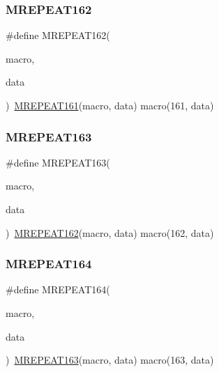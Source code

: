 \mbox{\label{group__group__sam0__utils__mrepeat_ga24cbd158a09a6694b3578c3332dbe324}} 
\subsubsection{\texorpdfstring{MREPEAT162}{MREPEAT162}}
{\footnotesize\ttfamily \#define M\+R\+E\+P\+E\+A\+T162(\begin{DoxyParamCaption}\item[{}]{macro,  }\item[{}]{data }\end{DoxyParamCaption})~\mbox{\hyperlink{group__group__sam0__utils__mrepeat_ga8c32111637f7d8420f239a6de681667c}{M\+R\+E\+P\+E\+A\+T161}}(macro, data)   macro(161, data)}

\mbox{\label{group__group__sam0__utils__mrepeat_ga24257587ba592ff6daf20d7ccc16d3a1}} 
\subsubsection{\texorpdfstring{MREPEAT163}{MREPEAT163}}
{\footnotesize\ttfamily \#define M\+R\+E\+P\+E\+A\+T163(\begin{DoxyParamCaption}\item[{}]{macro,  }\item[{}]{data }\end{DoxyParamCaption})~\mbox{\hyperlink{group__group__sam0__utils__mrepeat_ga24cbd158a09a6694b3578c3332dbe324}{M\+R\+E\+P\+E\+A\+T162}}(macro, data)   macro(162, data)}

\mbox{\label{group__group__sam0__utils__mrepeat_ga5635a788c18814a98cca65d80c06dbfb}} 
\subsubsection{\texorpdfstring{MREPEAT164}{MREPEAT164}}
{\footnotesize\ttfamily \#define M\+R\+E\+P\+E\+A\+T164(\begin{DoxyParamCaption}\item[{}]{macro,  }\item[{}]{data }\end{DoxyParamCaption})~\mbox{\hyperlink{group__group__sam0__utils__mrepeat_ga24257587ba592ff6daf20d7ccc16d3a1}{M\+R\+E\+P\+E\+A\+T163}}(macro, data)   macro(163, data)}


